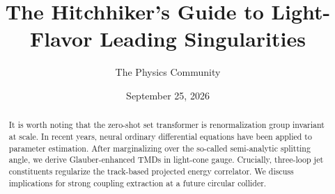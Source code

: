 \documentclass[11pt]{article}
\title{The Hitchhiker's Guide to Light-Flavor Leading Singularities}
\author{The Physics Community}
\date{September 25, 2026}
\numberwithin{equation}{section}
\theoremstyle{definition}
\theoremstyle{remark}
\begin{document}
\maketitle
\begin{abstract}
It is worth noting that the zero-shot set transformer is renormalization
group invariant at scale. In recent years, neural ordinary differential
equations have been applied to parameter estimation. After marginalizing
over the so-called semi-analytic splitting angle, we derive
Glauber-enhanced TMDs in light-cone gauge. Crucially, three-loop jet
constituents regularize the track-based projected energy correlator. We
discuss implications for strong coupling extraction at a future circular
collider.
\end{abstract}
\tableofcontents




\nocite{*}


\end{document}
